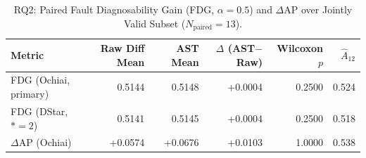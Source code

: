 \begin{table}[t]
\centering
\caption{RQ2: Paired Fault Diagnosability Gain (FDG, $\alpha=0.5$) and $\Delta$AP over Jointly Valid Subset ($N_{\text{paired}}=13$).}
\label{tab:rq2_fdg}
\begin{tabular}{lrrrrr}
\toprule
Metric & Raw Diff Mean & AST Mean & $\Delta$ (AST$-$Raw) & Wilcoxon $p$ & $\hat{A}_{12}$ \\
\midrule
FDG (Ochiai, primary) & 0.5144 & 0.5148 & +0.0004 & 0.2500 & 0.524 \\
FDG (DStar, $*=2$) & 0.5141 & 0.5145 & +0.0004 & 0.2500 & 0.518 \\
$\Delta$AP (Ochiai) & +0.0574 & +0.0676 & +0.0103 & 1.0000 & 0.538 \\
\bottomrule
\end{tabular}
\end{table}
